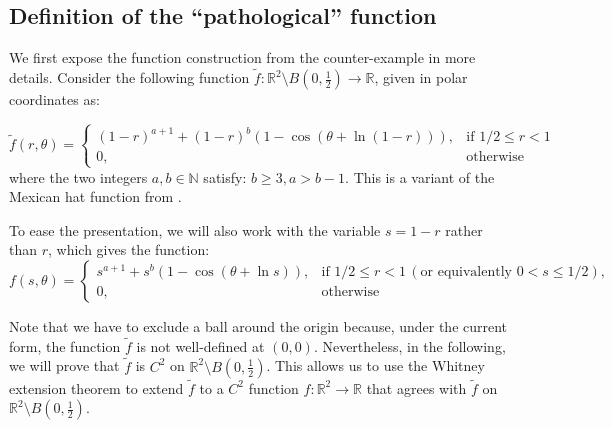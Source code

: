 \documentclass{article}
\theoremstyle{plain}
\theoremstyle{definition}
\theoremstyle{remark}
\newcommand*{\RR}{\mathbb{R}}
\newcommand*{\NN}{\mathbb{N}}
\begin{document}
\subsection{Definition of the ``pathological'' function}

We first expose the function construction from the counter-example in more details.
Consider the following function $\tilde{f}: \RR^2 \setminus B\left(0,\frac{1}{2}\right) \to \RR$, given in polar coordinates as:

\begin{equation}
    \label{eq:mexican-hat-function-variant}
    \tilde{f}(r,\theta) = \begin{cases}
        (1 - r)^{a+1} + (1 - r)^{b} (1 - \cos(\theta + \ln (1 - r))), &\text{if } 1/2 \leq r < 1\\
        0, &\text{otherwise}
    \end{cases} 
\end{equation}
where the two integers $a, b \in \NN$ satisfy: $b \geq 3, a > b - 1$. This is a variant of the Mexican hat function from \citep{absil2005convergence}.

To ease the presentation, we will also work with the variable $s = 1 - r$ rather than $r$, which gives the function:
\begin{equation}
    \label{eq:mexican-hat-function-variant-variable-s}
    f(s,\theta) = \begin{cases}
        s^{a+1} + s^{b} (1 - \cos(\theta + \ln s)), &\text{if } 1/2 \leq r < 1\,(\text{or equivalently } 0 < s \leq 1/2),\\
        0, &\text{otherwise}
    \end{cases} 
\end{equation}

Note that we have to exclude a ball around the origin because, under the current form, the function $\tilde{f}$ is not well-defined at $(0,0)$.
Nevertheless, in the following, we will prove that $\tilde{f}$ is $C^2$ on $\RR^2 \setminus B\left(0, \frac{1}{2}\right)$.
This allows us to use the Whitney extension theorem \citep{whitney1934analytic} to extend $\tilde{f}$ to a $C^2$ function $f:\RR^2 \to \RR$ that agrees with $\tilde{f}$ on $\RR^2 \setminus B\left(0, \frac{1}{2}\right)$.
\end{document}
